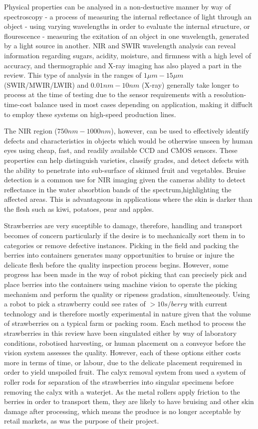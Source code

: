 \documentclass[fleqn,twoside]{article}
\begin{document}
Physical properties can be analysed in a non-destuctive manner by way of spectroscopy - a process of measuring the internal reflectance of light through an object - using varying wavelengths in order to evaluate the internal structure, or flourescence - measuring the exitation of an object in one wavelength, generated by a light source in another. NIR and SWIR wavelength analysis can reveal information regarding sugars, acidity, moisture, and firmness with a high level of accuracy, and thermographic and X-ray imaging has also played a part in the review. This type of analysis in the ranges of $1\mu m-15\mu m$ (SWIR/MWIR/LWIR) and $0.01nm-10nm$ (X-ray) generally take longer to process at the time of testing due to the sensor requirements with a resolution-time-cost balance used in most cases depending on application, making it diffuclt to employ these systems on high-speed production lines.  

The NIR region ($750nm-1000nm$), however, can be used to effectively identify defects and characteristics in objects which would be otherwise unseen by human eyes using cheap, fast, and readily available CCD and CMOS sensors. These properties can help distinguish varieties, classify grades, and detect defects with the ability to penetrate into sub-surface of skinned fruit and vegetables. Bruise detection is a common use for NIR imaging given the cameras ability to detect reflectance in the water absorbtion bands of the spectrum,highlighting the affected areas. This is advantageous in applications where the skin is darker than the flesh such as kiwi, potatoes, pear and apples.

Strawberries are very suceptible to damage, therefore, handling and transport becomes of concern particularly if the desire is to mechanically sort them in to categories or remove defective instances. Picking in the field and packing the berries into containers generates many opportunities to bruise or injure the delicate flesh before the quality inspection process begins. However, some progress has been made in the way of robot picking that can precisely pick and place berries into the containers using machine vision to operate the picking mechanism and perform the quality or ripeness gradation, simulteneously. Using a robot to pick a strawberry could see rates of $>10s/berry$ with current technology and is therefore mostly experimental in nature given that the volume of strawberries on a typical farm or packing room. Each method to process the strawberries in this review have been singulated either by way of laboratory conditions, robotised harvesting, or human placement on a conveyor before the vision system assesses the quality. However, each of these options either costs more in terms of time, or labour, due to the delicate placement requiremed in order to yield unspoiled fruit. The calyx removal system from \cite{lin} used a system of roller rods for separation of the strawberries into singular specimens before removing the calyx with a waterjet. As the metal rollers apply friction to the berries in order to transport them, they are likely to have bruising and other skin damage after processing, which means the produce is no longer acceptable by retail markets, as was the purpose of their project. 
\end{document}
